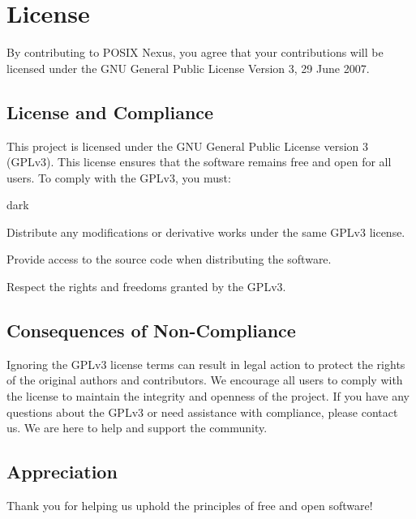 \newpage
\section{License}
\label{sec:license}
By contributing to POSIX Nexus, you agree that your contributions will be licensed under the GNU General Public License Version 3, 29 June 2007.

\subsection{License and Compliance}
\label{sec:license:sub:compliance}
This project is licensed under the GNU General Public License version 3 (GPLv3). This license ensures that the software remains free and open for all users.
To comply with the GPLv3, you must:
\begin{baseBoxOne}{}{dark}
    \begin{posnexItemize}
        \item[\sA] Distribute any modifications or derivative works under the same GPLv3 license.
        \item[\sA] Provide access to the source code when distributing the software.
        \item[\sA] Respect the rights and freedoms granted by the GPLv3.
    \end{posnexItemize}
\end{baseBoxOne}

\subsection{Consequences of Non-Compliance}
\label{sec:license:sub:consequence}
Ignoring the GPLv3 license terms can result in legal action to protect the rights of the original authors and contributors. We encourage all users to comply with the license to maintain the integrity and openness of the project. If you have any questions about the GPLv3 or need assistance with compliance, please contact us. We are here to help and support the community.

\label{sec:license:sub:appreciation}
\subsection{Appreciation}
Thank you for helping us uphold the principles of free and open software!